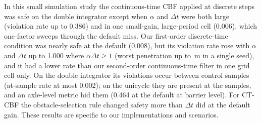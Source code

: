 In this small simulation study the continuous-time CBF applied at discrete steps was safe on the double integrator except when $\alpha$ and $\Delta t$ were both large (violation rate up to 0.386) and in one small-gain, large-period cell (0.006), which one-factor sweeps through the default miss. Our first-order discrete-time condition was nearly safe at the default (0.008), but its violation rate rose with $\alpha$ and $\Delta t$ up to 1.000 where $\alpha\Delta t\ge1$ (worst penetration up to \,m in a single seed), and it had a lower rate than our second-order continuous-time filter in one grid cell only. On the double integrator its violations occur between control samples (at-sample rate at most 0.002); on the unicycle they are present at the samples, and an axle-level metric hid them (0.464 at the default at barrier level). For CT-CBF the obstacle-selection rule changed safety more than $\Delta t$ did at the default gain. These results are specific to our implementations and scenarios.
